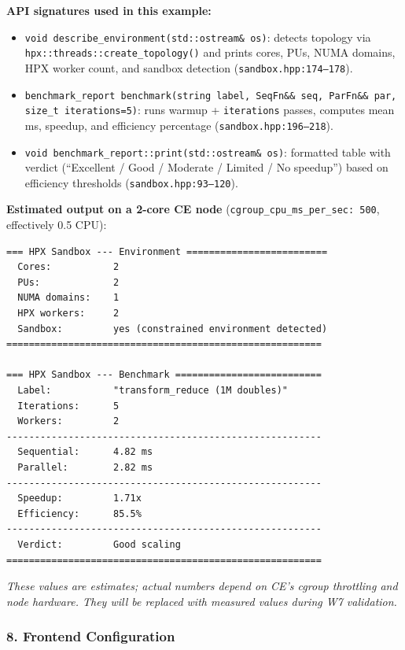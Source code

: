 \documentclass[11pt, a4paper]{article}
\newcommand{\code}[1]{\texttt{#1}}
\newcommand{\cefile}[1]{\texttt{#1}}
\begin{document}
\textbf{API signatures used in this example:}
\begin{itemize}[leftmargin=2em, itemsep=1pt]
  \item \code{void describe\_environment(std::ostream\& os)}: detects
        topology via \code{hpx::threads::create\_topology()} and prints
        cores, PUs, NUMA domains, HPX worker count, and sandbox detection
        (\cefile{sandbox.hpp:174--178}).
  \item \code{benchmark\_report benchmark(string label, SeqFn\&\& seq,
        ParFn\&\& par, size\_t iterations=5)}: runs warmup + \code{iterations}
        passes, computes mean ms, speedup, and efficiency percentage
        (\cefile{sandbox.hpp:196--218}).
  \item \code{void benchmark\_report::print(std::ostream\& os)}:
        formatted table with verdict (``Excellent / Good / Moderate / Limited /
        No speedup'') based on efficiency thresholds
        (\cefile{sandbox.hpp:93--120}).
\end{itemize}

\textbf{Estimated output on a 2-core CE node}
(\code{cgroup\_cpu\_ms\_per\_sec: 500}, effectively 0.5 CPU):
\begin{lstlisting}[style=diff, caption={Estimated CE output from default example (2-core node)}]
=== HPX Sandbox --- Environment =========================
  Cores:           2
  PUs:             2
  NUMA domains:    1
  HPX workers:     2
  Sandbox:         yes (constrained environment detected)
========================================================

=== HPX Sandbox --- Benchmark ==========================
  Label:           "transform_reduce (1M doubles)"
  Iterations:      5
  Workers:         2
--------------------------------------------------------
  Sequential:      4.82 ms
  Parallel:        2.82 ms
--------------------------------------------------------
  Speedup:         1.71x
  Efficiency:      85.5%
--------------------------------------------------------
  Verdict:         Good scaling
========================================================
\end{lstlisting}
\noindent\textit{These values are estimates; actual numbers depend on CE's
cgroup throttling and node hardware.  They will be replaced with measured
values during W7 validation.}

\subsubsection*{8. Frontend Configuration}
\end{document}
